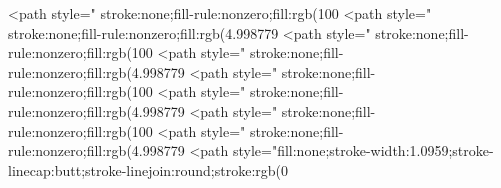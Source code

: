 <path style=" stroke:none;fill-rule:nonzero;fill:rgb(100%
<path style=" stroke:none;fill-rule:nonzero;fill:rgb(4.998779%
<path style=" stroke:none;fill-rule:nonzero;fill:rgb(100%
<path style=" stroke:none;fill-rule:nonzero;fill:rgb(4.998779%
<path style=" stroke:none;fill-rule:nonzero;fill:rgb(100%
<path style=" stroke:none;fill-rule:nonzero;fill:rgb(4.998779%
<path style=" stroke:none;fill-rule:nonzero;fill:rgb(100%
<path style=" stroke:none;fill-rule:nonzero;fill:rgb(4.998779%
<path style="fill:none;stroke-width:1.0959;stroke-linecap:butt;stroke-linejoin:round;stroke:rgb(0%
